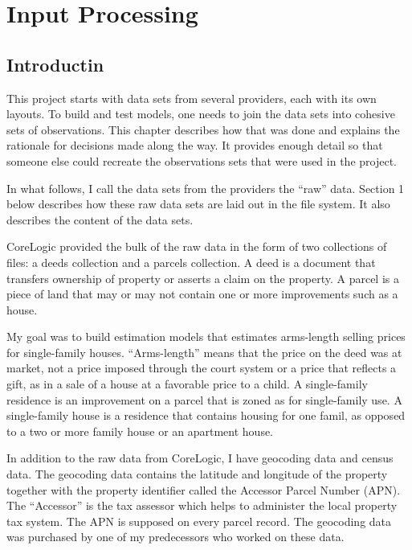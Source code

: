 

\chapter{Input Processing}

\section{Introductin}
This project starts with data sets from several providers, each with
its own layouts. To build and test models, one needs to join the data
sets into cohesive sets of observations. This chapter describes how
that was done and explains the rationale for decisions made along the
way. It provides enough detail so that someone else could recreate the
observations sets that were used in the project.

In what follows, I call the data sets from the providers the ``raw''
data. Section 1 below describes how these raw data sets are laid out in
the file system. It also describes the content of the data sets. 


CoreLogic provided the bulk of the raw data in the form of two collections of
files: a deeds collection and a parcels collection. A deed is a document that
transfers ownership of property or asserts a claim on the property. A parcel is
a piece of land that may or may not contain one or more improvements such as a
house.

My goal was to build estimation models that estimates arms-length
selling prices for single-family houses. ``Arms-length'' means that
the price on the deed was at market, not a price imposed through the
court system or a price that reflects a gift, as in a sale of a house
at a favorable price to a child. A single-family residence is an
improvement on a parcel that is zoned as for single-family use. A
single-family house is a residence that contains housing for one famil, as opposed
to a two or more family house or an apartment house. 

In addition to the raw data from CoreLogic, I have geocoding data and
census data. The geocoding data contains the latitude and longitude of
the property together with the property identifier called the Accessor
Parcel Number (APN). The ``Accessor'' is the tax assessor which helps
to administer the local property tax system. The APN is supposed on every
parcel record. The geocoding data was purchased by one of my predecessors
who worked on these data.

